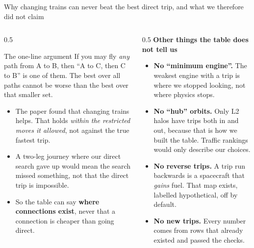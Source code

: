 \documentclass[aspectratio=169,10pt]{beamer}
\begin{document}
\begin{frame}{Why changing trains can never beat the best direct trip, and what we therefore did not claim}
  \begin{columns}[T]
    \begin{column}{0.5\textwidth}
      \small
      \begin{block}{The one-line argument}
        If you may fly \emph{any} path from A to B, then ``A to C, then C to B'' is one of them. The best over all paths cannot be worse than the best over that smaller set.
      \end{block}
      \vspace{2pt}
      \begin{itemize}
        \setlength\itemsep{3pt}
        \item The paper found that changing trains helps. That holds \emph{within the restricted moves it allowed}, not against the true fastest trip.
        \item A two-leg journey where our direct search gave up would mean the search missed something, not that the direct trip is impossible.
        \item So the table can say \textbf{where connections exist}, never that a connection is cheaper than going direct.
      \end{itemize}
    \end{column}
    \begin{column}{0.5\textwidth}
      \small
      \textbf{Other things the table does not tell us}
      \begin{itemize}
        \setlength\itemsep{3pt}
        \item \textbf{No ``minimum engine''.} The weakest engine with a trip is where we stopped looking, not where physics stops.
        \item \textbf{No ``hub'' orbits.} Only L2 halos have trips both in and out, because that is how we built the table. Traffic rankings would only describe our choices.
        \item \textbf{No reverse trips.} A trip run backwards is a spacecraft that \emph{gains} fuel. That map exists, labelled hypothetical, off by default.
        \item \textbf{No new trips.} Every number comes from rows that already existed and passed the checks.
      \end{itemize}
    \end{column}
  \end{columns}
\end{frame}
\end{document}
